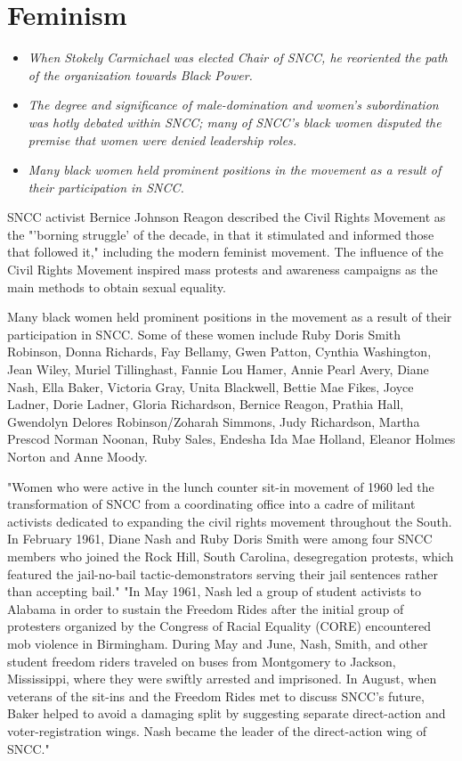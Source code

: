 \section{Feminism}\label{feminism}

\begin{itemize}
\item
  \emph{When Stokely Carmichael was elected Chair of SNCC, he reoriented
  the path of the organization towards Black Power.}
\item
  \emph{The degree and significance of male-domination and women's
  subordination was hotly debated within SNCC; many of SNCC's black
  women disputed the premise that women were denied leadership roles.}
\item
  \emph{Many black women held prominent positions in the movement as a
  result of their participation in SNCC.}
\end{itemize}

SNCC activist Bernice Johnson Reagon described the Civil Rights Movement
as the "'borning struggle' of the decade, in that it stimulated and
informed those that followed it," including the modern feminist
movement. The influence of the Civil Rights Movement inspired mass
protests and awareness campaigns as the main methods to obtain sexual
equality.

Many black women held prominent positions in the movement as a result of
their participation in SNCC. Some of these women include Ruby Doris
Smith Robinson, Donna Richards, Fay Bellamy, Gwen Patton, Cynthia
Washington, Jean Wiley, Muriel Tillinghast, Fannie Lou Hamer, Annie
Pearl Avery, Diane Nash, Ella Baker, Victoria Gray, Unita Blackwell,
Bettie Mae Fikes, Joyce Ladner, Dorie Ladner, Gloria Richardson, Bernice
Reagon, Prathia Hall, Gwendolyn Delores Robinson/Zoharah Simmons, Judy
Richardson, Martha Prescod Norman Noonan, Ruby Sales, Endesha Ida Mae
Holland, Eleanor Holmes Norton and Anne Moody.

"Women who were active in the lunch counter sit-in movement of 1960 led
the transformation of SNCC from a coordinating office into a cadre of
militant activists dedicated to expanding the civil rights movement
throughout the South. In February 1961, Diane Nash and Ruby Doris Smith
were among four SNCC members who joined the Rock Hill, South Carolina,
desegregation protests, which featured the jail-no-bail
tactic-demonstrators serving their jail sentences rather than accepting
bail." "In May 1961, Nash led a group of student activists to Alabama in
order to sustain the Freedom Rides after the initial group of protesters
organized by the Congress of Racial Equality (CORE) encountered mob
violence in Birmingham. During May and June, Nash, Smith, and other
student freedom riders traveled on buses from Montgomery to Jackson,
Mississippi, where they were swiftly arrested and imprisoned. In August,
when veterans of the sit-ins and the Freedom Rides met to discuss SNCC's
future, Baker helped to avoid a damaging split by suggesting separate
direct-action and voter-registration wings. Nash became the leader of
the direct-action wing of SNCC."

